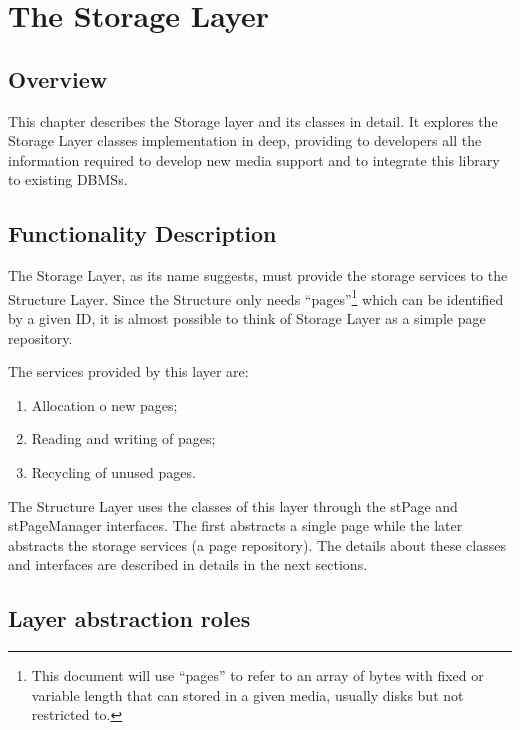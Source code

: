 \chapter{The Storage Layer}
\label{cha:storagelayer}

\section{Overview}

This chapter describes the Storage layer and its classes in detail. It explores the Storage Layer classes implementation in deep, providing to developers all the information required to develop new media support and to integrate this library to existing DBMSs.

\section{Functionality Description}
\label{sec:storagelayer.funcdesc}

The Storage Layer, as its name suggests, must provide the storage services to the Structure Layer. Since the Structure only needs ``pages''\footnote{This document will use ``pages'' to refer to an array of bytes with fixed or variable length that can stored in a given media, usually disks but not restricted to.} which can be identified by a given ID, it is almost possible to think of Storage Layer as a simple page repository.

The services provided by this layer are:
\begin{enumerate}
	\item Allocation o new pages;
	\item Reading and writing of pages;
	\item Recycling of unused pages.
\end{enumerate}

The Structure Layer uses the classes of this layer through the stPage and stPageManager interfaces. The first abstracts a single page while the later abstracts the storage services (a page repository). The details about these classes and interfaces are described in details in the next sections.

\section{Layer abstraction roles}

